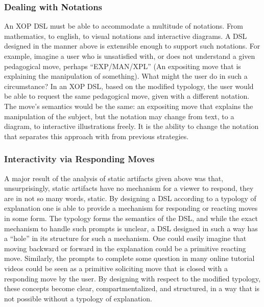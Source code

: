 \documentclass[conference]{IEEEtran}
\begin{document}
\subsubsection{Dealing with Notations}
An XOP DSL must be able to accommodate a multitude of notations. From
mathematics, to english, to visual notations and interactive diagrams. A DSL
designed in the manner above is extensible enough to support such
notations. For example, imagine a user who is unsatisfied with, or does not
understand a given pedagogical move, perhaps ``EXP/MAN/XPL'' (An expositing move
that is explaining the manipulation of something). What might the user do in such a
circumstance? In an XOP DSL, based on the modified typology, the user would be
able to request the same pedagogical move, given with a different notation. The move's
semantics would be the same: an expositing move that explains the
manipulation of the subject, but the notation may change from text, to a
diagram, to interactive illustrations freely. It is the ability to change the notation
that separates this approach with from previous strategies.

\subsubsection{Interactivity via Responding Moves}
A major result of the analysis of static artifacts given above was that,
unsurprisingly, static artifacts have no mechanism for a viewer to respond, they
are in not so many words, static. By designing a DSL according to a typology of
explanation one is able to provide a mechanism for responding or reacting moves
in some form. The typology forms the semantics of the DSL, and while the exact
mechanism to handle such prompts is unclear, a DSL designed in such a way has a
``hole'' in its structure for such a mechanism. One could easily imagine that
moving backward or forward in the explanation could be a primitive reacting
move. Similarly, the prompts to complete some question in many online tutorial
videos could be seen as a primitive soliciting move that is closed with a
responding move by the user. By designing with respect to the modified typology,
these concepts become clear, compartmentalized, and structured, in a way that is
not possible without a typology of explanation.
\end{document}
